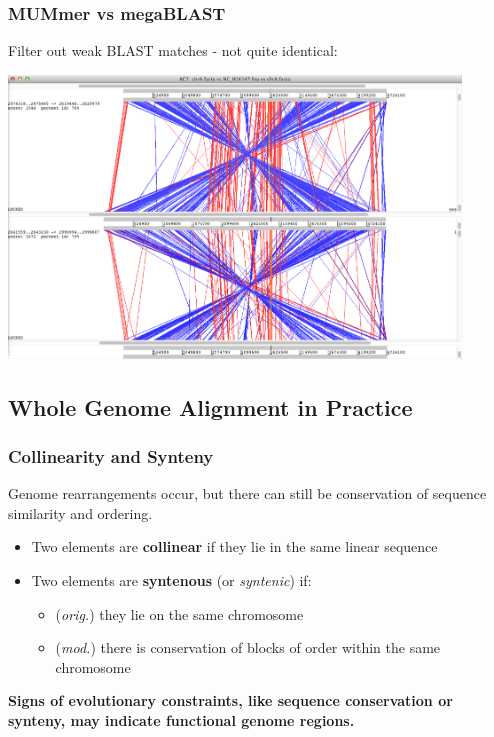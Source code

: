 \begin{frame}
  \frametitle{MUMmer vs megaBLAST}
  Filter out weak BLAST matches - not quite identical:
  \begin{center}
    \includegraphics[width=0.9\textwidth]{images/act_wgs10}
  \end{center}    
\end{frame}

\subsection{Whole Genome Alignment in Practice}

\begin{frame}
  \frametitle{Collinearity and Synteny}
  Genome rearrangements occur, but there can still be conservation of sequence similarity and ordering.\\
  \begin{itemize}
    \item Two elements are \textbf{collinear} if they lie in the same linear sequence
    \item Two elements are \textbf{syntenous} (or \textit{syntenic}) if:
    \begin{itemize}
      \item (\textit{orig.}) they lie on the same chromosome
      \item (\textit{mod.}) there is conservation of blocks of order within the same chromosome
    \end{itemize}
  \end{itemize}    
  \textbf{Signs of evolutionary constraints, like sequence conservation or synteny, may indicate functional genome regions.}
\end{frame}

